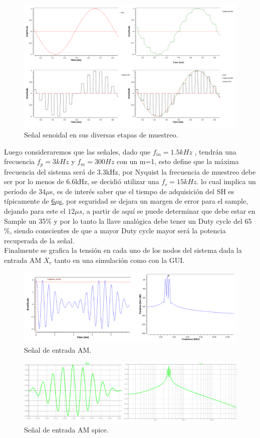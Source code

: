 \begin{figure}[H]
	\centering
	\includegraphics[width=1\textwidth]{ImagenesEjercicio7/t1.PNG}
\caption{Señal senoidal en sus diversas etapas de muestreo.}
	\label{fig:muestreo}
\end{figure}
Luego consideraremos que las señales, dado que $f_{in} = 1.5kHz$ , tendrán una frecuencia $f_p=3kHz$ y $f_m=300Hz$ con un m=1, esto define que la máxima frecuencia del sistema será de 3.3kHz, por Nyquist la frecuencia de muestreo debe ser por lo menos de 6.6kHz, se decidió utilizar una $f_s = 15kHz$. lo cual implica un período de 34$\mu$s, es de interés saber que el tiempo de adquisición  del SH es típicamente de \href{http://www.ti.com/lit/ds/symlink/lf398-n-mil.pdf}{6$\mu$s}, por seguridad se dejara un margen de error para el sample, dejando para este el $12\mu s$, a partir de aquí se puede determinar que debe estar en Sample un 35$\%$ y por lo tanto la llave analógica debe tener un Duty cycle del 65$\%$, siendo conscientes de que a mayor Duty cycle mayor será la potencia recuperada de la señal.
\\
Finalmente se grafica la tensión en cada uno de los nodos del sistema dada la entrada AM $X_c$ tanto en una simulación como con la GUI.
\begin{figure}[H]
	\centering
	\includegraphics[width=1\textwidth]{ImagenesEjercicio7/input.PNG}
\caption{Señal de entrada AM.}
	\label{fig:input}
\end{figure}
\begin{figure}[H]
	\centering
	\includegraphics[width=1\textwidth]{ImagenesEjercicio7/sinput.PNG}
\caption{Señal de entrada AM spice.}
	\label{fig:sinput}
\end{figure}

